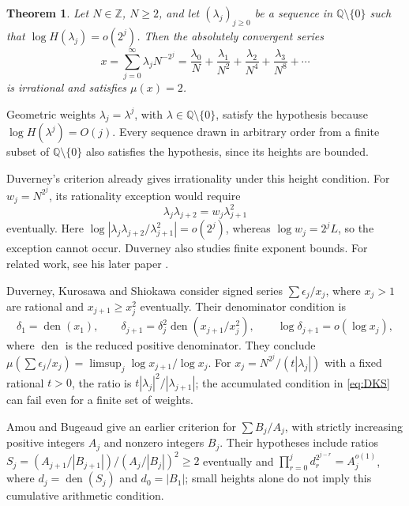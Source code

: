 \documentclass{amsart}
\newtheorem{theorem}{Theorem}
\numberwithin{equation}{section}
\newcommand{\Q}{\mathbb Q}
\newcommand{\Z}{\mathbb Z}
\begin{document}
\begin{theorem}\label{thm:main}
Let $N\in\Z$, $N\ge2$, and let $(\lambda_j)_{j\ge0}$ be a sequence
in $\Q\setminus\{0\}$ such that $\log H(\lambda_j)=o(2^j)$.
Then the absolutely convergent series
\begin{equation}\label{eq:x}
x=\sum_{j=0}^{\infty}\lambda_jN^{-2^j}
 =\frac{\lambda_0}{N}+\frac{\lambda_1}{N^2}
  +\frac{\lambda_2}{N^4}+\frac{\lambda_3}{N^8}+\cdots
\end{equation}
is irrational and satisfies $\mu(x)=2$.
\end{theorem}

Geometric weights $\lambda_j=\lambda^j$, with $\lambda\in\Q\setminus\{0\}$,
satisfy the hypothesis because $\log H(\lambda^j)=O(j)$.
Every sequence drawn in arbitrary order from a finite subset of
$\Q\setminus\{0\}$ also satisfies the hypothesis, since its heights are bounded.

Duverney's criterion \cite[Corollary~3.4]{Du01} already gives
irrationality under this height condition. For $w_j=N^{2^j}$, its
rationality exception would require
\[
\lambda_j\lambda_{j+2}=w_j\lambda_{j+1}^2
\]
eventually. Here
$\log|\lambda_j\lambda_{j+2}/\lambda_{j+1}^2|=o(2^j)$, whereas
$\log w_j=2^jL$, so the exception cannot occur.
Duverney \cite[Theorem~3.2]{Du01} also studies finite exponent bounds.
For related work, see his later paper \cite{Du24}.

Duverney, Kurosawa and Shiokawa \cite[Theorem~1]{DKS} consider signed
series $\sum\epsilon_j/x_j$, where $x_j>1$ are rational and
$x_{j+1}\ge x_j^2$ eventually. Their denominator condition is
\begin{equation}\label{eq:DKS}
\delta_1=\operatorname{den}(x_1),\qquad
\delta_{j+1}=\delta_j^2\operatorname{den}(x_{j+1}/x_j^2),\qquad
\log\delta_{j+1}=o(\log x_j),
\end{equation}
where $\operatorname{den}$ is the reduced positive denominator.
They conclude
$\mu(\sum\epsilon_j/x_j)=\limsup_j\log x_{j+1}/\log x_j$.
For $x_j=N^{2^j}/(t|\lambda_j|)$ with a fixed rational $t>0$,
the ratio is $t|\lambda_j|^2/|\lambda_{j+1}|$; the accumulated
condition in \eqref{eq:DKS} can fail even for a finite set of weights.

Amou and Bugeaud \cite[Lemma~3]{AB} give an earlier criterion for
$\sum B_j/A_j$, with strictly increasing positive integers $A_j$
and nonzero integers $B_j$. Their hypotheses include ratios
$S_j=(A_{j+1}/|B_{j+1}|)/(A_j/|B_j|)^2\ge2$ eventually and
$\prod_{r=0}^j d_r^{2^{j-r}}=A_j^{o(1)}$, where
$d_j=\operatorname{den}(S_j)$ and $d_0=|B_1|$; small heights alone
do not imply this cumulative arithmetic condition.
\end{document}
